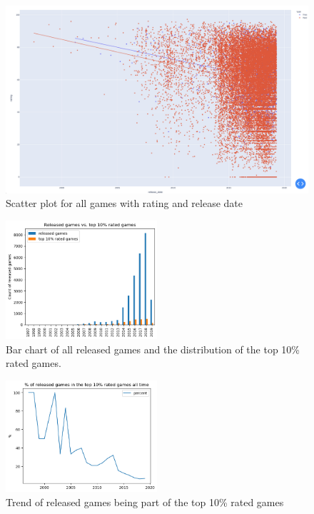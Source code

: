 \documentclass[11pt]{article}
\begin{document}
\begin{figure}
    \centering
    \includegraphics[width=1\textwidth]{graphics/insight2_graph1.png}
    \caption{Scatter plot for all games with rating and release date}
    \label{fig:insight2_1}
\end{figure}

\begin{figure}
    \centering
    \includegraphics[width=0.5\textwidth]{graphics/insight2_graph2.png}
    \caption{Bar chart of all released games and the distribution of the top 10\% rated games.}
    \label{fig:insight2_2}
\end{figure}

\begin{figure}
    \centering
    \includegraphics[width=0.5\textwidth]{graphics/insight2_graph3.png}
    \caption{Trend of released games being part of the top 10\% rated games}
    \label{fig:insight2_3}
\end{figure}
\end{document}
